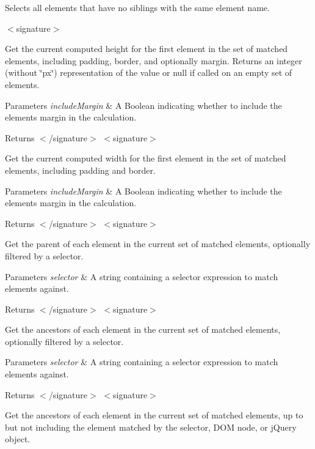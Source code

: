 Selects all elements that have no siblings with the same element name.

$<$signature$>$ 

Get the current computed height for the first element in the set of matched elements, including padding, border, and optionally margin. Returns an integer (without \char`\"{}px\char`\"{}) representation of the value or null if called on an empty set of elements.


\begin{DoxyParams}{Parameters}
{\em include\+Margin} & A Boolean indicating whether to include the element\textquotesingle{}s margin in the calculation.\\
\hline
\end{DoxyParams}
\begin{DoxyReturn}{Returns}
$<$/signature$>$ $<$signature$>$ 

Get the current computed width for the first element in the set of matched elements, including padding and border.
\end{DoxyReturn}

\begin{DoxyParams}{Parameters}
{\em include\+Margin} & A Boolean indicating whether to include the element\textquotesingle{}s margin in the calculation.\\
\hline
\end{DoxyParams}
\begin{DoxyReturn}{Returns}
$<$/signature$>$ $<$signature$>$ 

Get the parent of each element in the current set of matched elements, optionally filtered by a selector.
\end{DoxyReturn}

\begin{DoxyParams}{Parameters}
{\em selector} & A string containing a selector expression to match elements against.\\
\hline
\end{DoxyParams}
\begin{DoxyReturn}{Returns}
$<$/signature$>$ $<$signature$>$ 

Get the ancestors of each element in the current set of matched elements, optionally filtered by a selector.
\end{DoxyReturn}

\begin{DoxyParams}{Parameters}
{\em selector} & A string containing a selector expression to match elements against.\\
\hline
\end{DoxyParams}
\begin{DoxyReturn}{Returns}
$<$/signature$>$ $<$signature$>$ 

Get the ancestors of each element in the current set of matched elements, up to but not including the element matched by the selector, D\+O\+M node, or j\+Query object.
\end{DoxyReturn}

